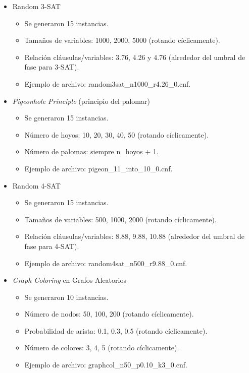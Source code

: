 \begin{itemize}
    \item Random 3-SAT 
    \begin{itemize}
        \item Se generaron 15 instancias.
        \item Tamaños de variables: 1000, 2000, 5000 (rotando cíclicamente).
        \item Relación cláusulas/variables: 3.76, 4.26 y 4.76 (alrededor del umbral de fase para 3-SAT).
        \item Ejemplo de archivo: random3sat\_n1000\_r4.26\_0.cnf.
    \end{itemize}
    \item \textit{Pigeonhole Principle} (principio del palomar)
    \begin{itemize}
        \item Se generaron 15 instancias.
        \item Número de hoyos: 10, 20, 30, 40, 50 (rotando cíclicamente).
        \item Número de palomas: siempre n\_hoyos + 1.
        \item Ejemplo de archivo: pigeon\_11\_into\_10\_0.cnf.
    \end{itemize}
    \item Random 4-SAT
    \begin{itemize}
        \item Se generaron 15 instancias.
        \item Tamaños de variables: 500, 1000, 2000 (rotando cíclicamente).
        \item Relación cláusulas/variables: 8.88, 9.88, 10.88 (alrededor del umbral de fase para 4-SAT).
        \item Ejemplo de archivo: random4sat\_n500\_r9.88\_0.cnf.
    \end{itemize}
    \item \textit{Graph Coloring} en Grafos Aleatorios
    \begin{itemize}
        \item Se generaron 10 instancias.
        \item Número de nodos: 50, 100, 200 (rotando cíclicamente).
        \item Probabilidad de arista: 0.1, 0.3, 0.5 (rotando cíclicamente).
        \item Número de colores: 3, 4, 5 (rotando cíclicamente).
        \item Ejemplo de archivo: graphcol\_n50\_p0.10\_k3\_0.cnf.

\end{itemize}
\end{itemize}
